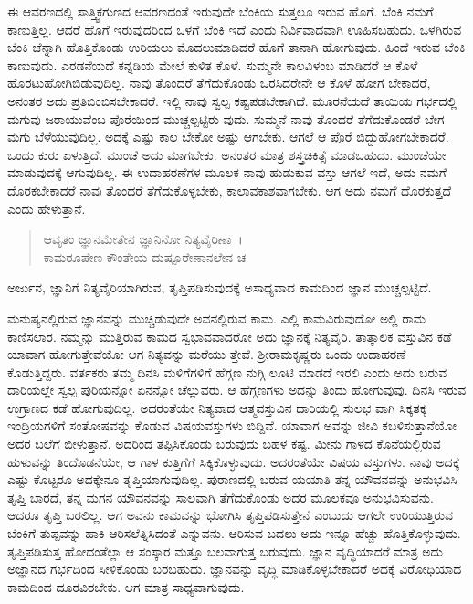 ಈ ಆವರಣದಲ್ಲಿ ಸಾತ್ತ್ವಿಕಗುಣದ ಆವರಣದಂತೆ ಇರುವುದೇ ಬೆಂಕಿಯ ಸುತ್ತಲೂ ಇರುವ ಹೊಗೆ. ಬೆಂಕಿ ನಮಗೆ ಕಾಣುತ್ತಿಲ್ಲ. ಆದರೆ ಹೊಗೆ ಇರುವುದರಿಂದ ಒಳಗೆ ಬೆಂಕಿ ಇದೆ ಎಂದು ನಿರ್ವಿವಾದವಾಗಿ ಊಹಿಸಬಹುದು. ಒಳಗಿರುವ ಬೆಂಕಿ ಚೆನ್ನಾಗಿ ಹೊತ್ತಿಕೊಂಡು ಉರಿಯಲು ಮೊದಲುಮಾಡಿದರೆ ಹೊಗೆ ತಾನಾಗಿ ಹೋಗುವುದು. ಹಿಂದೆ ಇರುವ ಬೆಂಕಿ ಕಾಣುವುದು. ಎರಡನೆಯದೆ ಕನ್ನಡಿಯ ಮೇಲೆ ಕುಳಿತ ಕೊಳೆ. ಸುಮ್ಮನೇ ಕಾಲವಿಳಂಬ ಮಾಡಿದರೆ ಆ ಕೊಳೆ ಹೊರಟುಹೋಗಿಬಿಡುವುದಿಲ್ಲ. ನಾವು ತೊಂದರೆ ತೆಗೆದುಕೊಂಡು ಒರಸಿದರೇನೇ ಆ ಕೊಳೆ ಹೋಗ ಬೇಕಾದರೆ, ಅನಂತರ ಅದು ಪ್ರತಿಬಿಂಬಿಸಬೇಕಾದರೆ. ಇಲ್ಲಿ ನಾವು ಸ್ವಲ್ಪ ಕಷ್ಟಪಡಬೇಕಾಗಿದೆ. ಮೂರನೆಯದೆ ತಾಯಿಯ ಗರ್ಭದಲ್ಲಿ ಮಗುವು ಜರಾಯುವೆಂಬ ಪೊರೆಯಿಂದ ಮುಚ್ಚಲ್ಪಟ್ಟಿರು ವುದು. ಸುಮ್ಮನೆ ನಾವು ತೊಂದರೆ ತೆಗೆದುಕೊಂಡರೆ ಬೇಗ ಮಗು ಬೆಳೆಯುವುದಿಲ್ಲ. ಅದಕ್ಕೆ ಎಷ್ಟು ಕಾಲ ಬೇಕೋ ಅಷ್ಟು ಆಗಬೇಕು. ಆಗಲೆ ಆ ಪೊರೆ ಬಿದ್ದುಹೋಗಬೇಕಾದರೆ. ಒಂದು ಕುರು ಏಳುತ್ತಿದೆ. ಮುಂಚೆ ಅದು ಮಾಗಬೇಕು. ಅನಂತರ ಮಾತ್ರ ಶಸ್ತ್ರಚಿಕಿತ್ಸೆ ಮಾಡಬಹುದು. ಮುಂಚೆಯೇ ಮಾಡುವುದಕ್ಕೆ ಆಗುವುದಿಲ್ಲ. ಈ ಉದಾಹರಣೆಗಳ ಮೂಲಕ ನಾವು ಹುಡುಕುವ ವಸ್ತು ಆಗಲೆ ಇದೆ, ಅದು ನಮಗೆ ದೊರಕಬೇಕಾದರೆ ನಾವು ತೊಂದರೆ ತೆಗೆದುಕೊಳ್ಳಬೇಕು, ಕಾಲಾವಕಾಶವಾಗಬೇಕು. ಆಗ ಅದು ನಮಗೆ ದೊರಕುತ್ತದೆ ಎಂದು ಹೇಳುತ್ತಾನೆ.

\begin{verse}
ಆವೃತಂ ಜ್ಞಾನಮೇತೇನ ಜ್ಞಾನಿನೋ ನಿತ್ಯವೈರಿಣಾ~।\\ಕಾಮರೂಪೇಣ ಕೌಂತೇಯ ದುಷ್ಪೂರೇಣಾನಲೇನ ಚ 
\end{verse}

{\small ಅರ್ಜುನ, ಜ್ಞಾನಿಗೆ ನಿತ್ಯವೈರಿಯಾಗಿರುವ, ತೃಪ್ತಿಪಡಿಸುವುದಕ್ಕೆ ಅಸಾಧ್ಯವಾದ ಕಾಮದಿಂದ ಜ್ಞಾನ ಮುಚ್ಚಲ್ಪಟ್ಟಿದೆ.}

ಮನುಷ್ಯನಲ್ಲಿರುವ ಜ್ಞಾನವನ್ನು ಮುಚ್ಚಿಡುವುದೇ ಅವನಲ್ಲಿರುವ ಕಾಮ. ಎಲ್ಲಿ ಕಾಮವಿರುವುದೋ ಅಲ್ಲಿ ರಾಮ ಕಾಣಿಸಲಾರ. ನಮ್ಮನ್ನು ಮುತ್ತಿರುವ ಕಾಮದ ಸ್ವಭಾವವಾದರೋ ಅದು ಜ್ಞಾನಕ್ಕೆ ನಿತ್ಯವೈರಿ. ತಾತ್ಕಾಲಿಕ ವಸ್ತುವಿನ ಕಡೆ ಯಾವಾಗ ಹೋಗುತ್ತೇವೆಯೋ ಆಗ ನಿತ್ಯವನ್ನು ಮರೆಯು ತ್ತೇವೆ. ಶ‍್ರೀರಾಮಕೃಷ್ಣರು ಒಂದು ಉದಾಹರಣೆ ಕೊಡುತ್ತಿದ್ದರು. ವರ್ತಕರು ತಮ್ಮ ದಿನಸಿ ಮಳಿಗೆಗಳಿಗೆ ಹೆಗ್ಗಣ ನುಗ್ಗಿ ಲೂಟಿ ಮಾಡದೆ ಇರಲಿ ಎಂದು ಅದು ಬರುವ ದಾರಿಯಲ್ಲೇ ಸ್ವಲ್ಪ ಪುರಿಯನ್ನೋ ಏನನ್ನೋ ಚೆಲ್ಲುವರು. ಆ ಹೆಗ್ಗಣಗಳು ಅದನ್ನು ತಿಂದು ಹೋಗುವುವು. ದಿನಸಿ ಇರುವ ಉಗ್ರಾಣದ ಕಡೆ ಹೋಗುವುದಿಲ್ಲ. ಅದರಂತೆಯೇ ನಿತ್ಯವಾದ ಆತ್ಮವಸ್ತುವಿನ ದಾರಿಯಲ್ಲಿ ಸುಲಭ ವಾಗಿ ಸಿಕ್ಕತಕ್ಕ ಇಂದ್ರಿಯಗಳಿಗೆ ಸಂತೋಷವನ್ನು ಕೊಡುವ ವಿಷಯವಸ್ತುಗಳು ಬಿದ್ದಿವೆ. ಯಾವಾಗ ಅವನ್ನು ಜೀವಿ ಕಬಳಿಸುತ್ತಾನೆಯೋ ಅದರ ಬಲೆಗೆ ಬೀಳುತ್ತಾನೆ. ಅದರಿಂದ ತಪ್ಪಿಸಿಕೊಂಡು ಬರುವುದು ಬಹಳ ಕಷ್ಟ. ಮೀನು ಗಾಳದ ಕೊನೆಯಲ್ಲಿರುವ ಹುಳುವನ್ನು ತಿಂದೊಡನೆಯೇ, ಆ ಗಾಳ ಕುತ್ತಿಗೆಗೆ ಸಿಕ್ಕಿಕೊಳ್ಳುವುದು. ಅದರಂತೆಯೇ ವಿಷಯ ವಸ್ತುಗಳು. ನಾವು ಅದಕ್ಕೆ ಎಷ್ಟು ಕೊಟ್ಟರೂ ಅದಕ್ಕೇನೂ ತೃಪ್ತಿಯಾಗುವುದಿಲ್ಲ. ಪುರಾಣದಲ್ಲಿ ಬರುವ ಯಯಾತಿ ತನ್ನ ಯೌವನವನ್ನು ಅನುಭವಿಸಿ ತೃಪ್ತಿ ಬಾರದೆ, ತನ್ನ ಮಗನ ಯೌವನವನ್ನು ಸಾಲವಾಗಿ ತೆಗೆದುಕೊಂಡು ಅದರ ಮೂಲಕವೂ ಅನುಭವಿಸುವನು. ಆದರೂ ತೃಪ್ತಿ ಬರಲಿಲ್ಲ. ಆಗ ಅವನು ಕಾಮವನ್ನು ಭೋಗಿಸಿ ತೃಪ್ತಿಪಡಿಸುತ್ತೇನೆ ಎಂಬುದು ಆಗಲೇ ಉರಿಯುತ್ತಿರುವ ಬೆಂಕಿಗೆ ತುಪ್ಪವನ್ನು ಹಾಕಿ ಆರಿಸಲೆತ್ನಿಸಿದಂತೆ ಎನ್ನುವನು. ಆರಿಸುವ ಬದಲು ಅದು ಇನ್ನೂ ಹೆಚ್ಚು ಹೊತ್ತಿಕೊಳ್ಳುವುದು. ತೃಪ್ತಿಪಡಿಸುತ್ತ ಹೋದಂತೆಲ್ಲಾ ಆ ಸಂಸ್ಕಾರ ಮತ್ತೂ ಬಲವಾಗುತ್ತ ಬರುವುದು. ಜ್ಞಾನ ವೃದ್ಧಿಯಾದರೆ ಮಾತ್ರ ಅದು ಅಜ್ಞಾನದ ಗರ್ಭದಿಂದ ಸೀಳಿಕೊಂಡು ಬರಬಹುದು. ಜ್ಞಾನವನ್ನು ವೃದ್ಧಿ ಮಾಡಿಕೊಳ್ಳಬೇಕಾದರೆ ಅದಕ್ಕೆ ವಿರೋಧಿಯಾದ ಕಾಮದಿಂದ ದೂರವಿರಬೇಕು. ಆಗ ಮಾತ್ರ ಸಾಧ್ಯವಾಗುವುದು.

